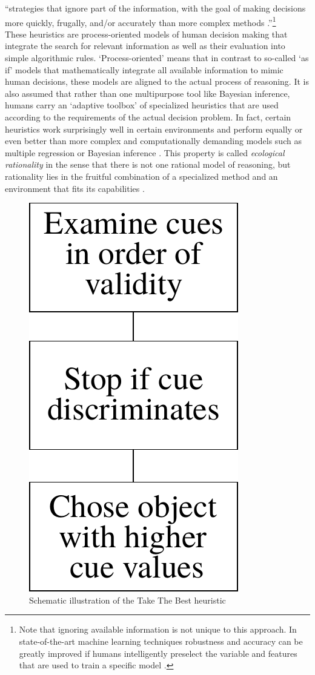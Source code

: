 ``strategies that ignore part of the information, with the goal of making decisions more quickly, frugally, and/or accurately than more complex methods \citep{Gigerenzer2011}.''\footnote{Note that ignoring available information is not unique to this approach. In state-of-the-art machine learning techniques robustness and accuracy can be greatly improved if humans intelligently preselect the variable and features that are used to train a specific model \citep{Guyon2003}.} \\

These heuristics are process-oriented models of human decision making that integrate the search for relevant information as well as their evaluation into simple algorithmic rules. `Process-oriented' means that in contrast to so-called `as if' models that mathematically integrate all available information to mimic human decisions, these models are aligned to the actual process of reasoning. It is also assumed that rather than one multipurpose tool like Bayesian inference, humans carry an `adaptive toolbox' of specialized heuristics \citep{gigerenzer2002bounded} that are used according to the requirements of the actual decision problem.
In fact, certain heuristics work surprisingly well in certain environments and perform equally or even better than more complex and computationally demanding models such as multiple regression or Bayesian inference \citep{Gigerenzer2009}. This property is called \emph{ecological rationality} in the sense that there is not one rational model of reasoning, but rationality lies in the fruitful combination of a specialized method and an environment that fits its capabilities \citep{todd2007environments}.
\begin{figure}
  \centering
  \includegraphics[width = .18 \textwidth]{figures/TTB.pdf}
  \caption{Schematic illustration of the Take The Best heuristic}
  \label{TTB}
\end{figure}
